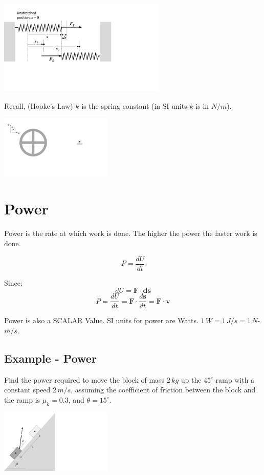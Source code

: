 \documentclass[12pt,letterpaper,twoside]{report}
\begin{document}
\newpage

 \includegraphics[trim={1cm 6cm 11.5cm 0cm},clip,width=0.6\textwidth, left]{Slide65}

Recall, (Hooke’s Law) $k$ is the spring constant (in SI units $k$ is in $N/m$). 

 \includegraphics[trim={0cm 5cm 19cm 1cm},clip,width=0.4\textwidth, left]{Slide66}


\section{Power}
Power is the rate at which work is done.  The higher the power the faster work is done.  

\[
\displaystyle P = \frac{dU}{dt}
\]

Since:
\[
dU = \bm{F} \cdot \bm{ds}
\]
\[
\displaystyle P = \frac{dU}{dt} = \bm{F} \cdot \frac{d\bm{s}}{dt} = \bm{F} \cdot \bm{v}
\]

Power is also a SCALAR Value.  SI units for power are Watts. $1 \, W = 1 \, J/s = 1 \, N$-$m/s$.

\subsection{Example - Power}
Find the power required to move the block of mass $2 \, kg$ up the $45^{\circ}$ ramp with a constant speed $2 \, m/s$, assuming the coefficient of friction between the block and the ramp is $\mu_k = 0.3$, and $\theta =15^{\circ}$. 

 \includegraphics[trim={0cm 0cm 18cm 1cm},clip,width=0.4\textwidth, left]{Slide64}
\end{document}
